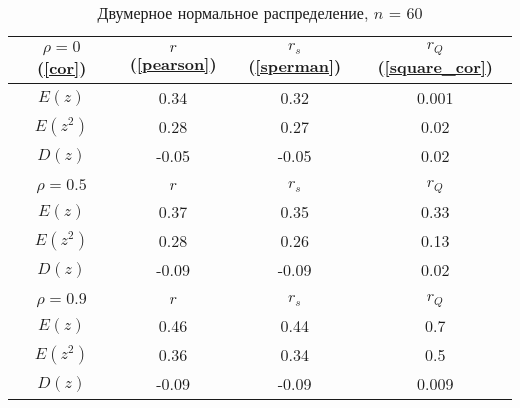 \documentclass[a4paper]{article}
\begin{document}
        \begin{table}[H]
            \centering
            \begin{tabular}{|c|c|c|c|}
                \hline
                 $\rho = 0$ (\ref{cor}) & $r$ (\ref{pearson}) & $r_s$ (\ref{sperman}) & $r_Q$ (\ref{square_cor})  \\ \hline
                 $E(z)$ & 0.34 & 0.32 & 0.001  \\ \hline
                 $E(z^2)$ & 0.28 & 0.27 & 0.02  \\ \hline
                 $D(z)$ & -0.05 & -0.05 & 0.02  \\ \hline
                 & & & \\ \hline
                 $\rho = 0.5$ & $r$ & $r_s$ & $r_Q$  \\ \hline
                 $E(z)$ & 0.37 & 0.35 & 0.33 \\ \hline
                 $E(z^2)$ & 0.28 & 0.26 & 0.13  \\ \hline
                 $D(z)$ & -0.09 & -0.09 & 0.02 \\ \hline
                 & & & \\ \hline
                 $\rho = 0.9$ & $r$ & $r_s$ & $r_Q$  \\ \hline
                 $E(z)$ & 0.46 & 0.44 & 0.7  \\ \hline
                 $E(z^2)$ & 0.36 & 0.34 & 0.5  \\ \hline
                 $D(z)$ & -0.09 & -0.09 & 0.009  \\ \hline
                 
            \end{tabular}
            \caption{Двумерное нормальное распределение, $n$ = 60}
            \label{tab:normal_60}
        \end{table}
        
\end{document}

